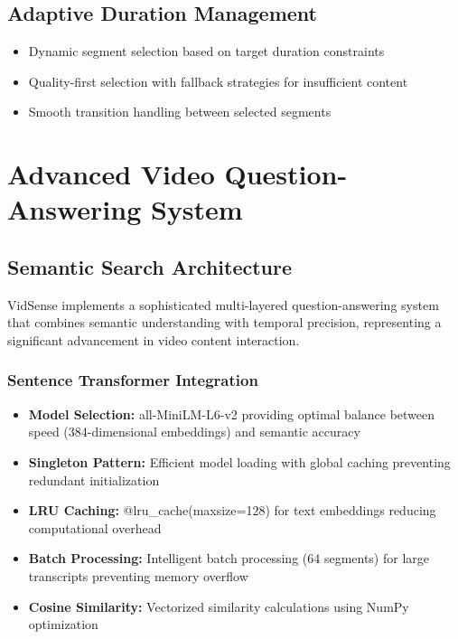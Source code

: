 \documentclass{bscs}
\begin{document}
\subsection{Adaptive Duration Management}

\begin{itemize}
\item Dynamic segment selection based on target duration constraints
\item Quality-first selection with fallback strategies for insufficient content
\item Smooth transition handling between selected segments
\end{itemize}

\section{Advanced Video Question-Answering System}

\subsection{Semantic Search Architecture}

VidSense implements a sophisticated multi-layered question-answering system that combines semantic understanding with temporal precision, representing a significant advancement in video content interaction.

\subsubsection{Sentence Transformer Integration}

\begin{itemize}
\item \textbf{Model Selection:} all-MiniLM-L6-v2 providing optimal balance between speed (384-dimensional embeddings) and semantic accuracy
\item \textbf{Singleton Pattern:} Efficient model loading with global caching preventing redundant initialization
\item \textbf{LRU Caching:} @lru\_cache(maxsize=128) for text embeddings reducing computational overhead
\item \textbf{Batch Processing:} Intelligent batch processing (64 segments) for large transcripts preventing memory overflow
\item \textbf{Cosine Similarity:} Vectorized similarity calculations using NumPy optimization
\end{itemize}
\end{document}
